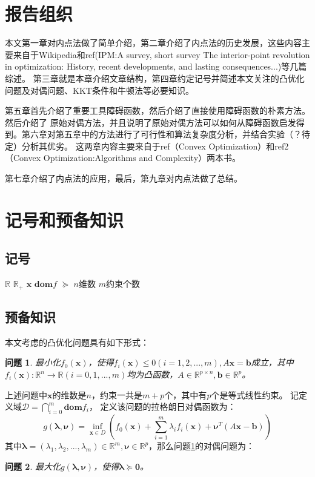\documentclass{article}
\newtheorem{problem}{问题}
\begin{document}
\section{报告组织}
本文第一章对内点法做了简单介绍，第二章介绍了内点法的历史发展，这些内容主要来自于Wikipedia和ref(IPM:A survey, short survey The interior-point revolution in optimization: History, recent developments, and lasting consequences...)等几篇综述。
第三章就是本章介绍文章结构，第四章约定记号并简述本文关注的凸优化问题及对偶问题、KKT条件和牛顿法等必要知识。

第五章首先介绍了重要工具障碍函数，然后介绍了直接使用障碍函数的朴素方法。然后介绍了
原始对偶方法，并且说明了原始对偶方法可以如何从障碍函数启发得到。第六章对第五章中的方法进行了可行性和算法复杂度分析，并结合实验（？待定）分析其优劣。
这两章内容主要来自于ref（Convex Optimization）和ref2（Convex Optimization:Algorithms and Complexity）两本书。

第七章介绍了内点法的应用，最后，第九章对内点法做了总结。
\section{记号和预备知识}
\subsection{记号}
$\mathbb{R}$ $\mathbb{R}_+$
$\bm x$ $\textbf{dom}f$
$\succeq$
$n$维数 $m$约束个数
\subsection{预备知识}
本文考虑的凸优化问题具有如下形式：
\begin{problem}
最小化$f_0(\bm x)$，使得$f_i(\bm x)\le 0(i=1,2,...,m),A\bm x=\bm{b}$成立，其中$f_i(\bm x):\mathbb{R}^n\rightarrow\mathbb{R}(i=0,1,...,m)$均为凸函数，$A\in\mathbb{R}^{p\times n},\bm b\in\mathbb{R}^p$。
\label{general_convex_prob}
\end{problem}

上述问题中$\bm x$的维数是$n$，约束一共是$m+p$个，其中有$p$个是等式线性约束。
记定义域$\mathcal{D}=\bigcap\limits_{i=0}^{m}\textbf{dom}f_i$，
定义该问题的拉格朗日对偶函数为：
\begin{equation}
    g(\bm\lambda, \bm\nu)=\inf_{\bm x\in D}(f_0(\bm x)+\sum\limits_{i=1}^m\lambda_if_i(\bm x)+\bm\nu^T(A\bm x-\bm b))\label{dual_function}
\end{equation}
其中$\bm\lambda=(\lambda_1,\lambda_2,...,\lambda_m)\in\mathbb R^m,\bm\nu\in\mathbb{R}^p$，那么问题\ref{general_convex_prob}的对偶问题为：
\begin{problem}
最大化$g(\bm\lambda,\bm\nu)$，使得$\bm\lambda\succeq\bm 0$。
\end{problem}
\end{document}
